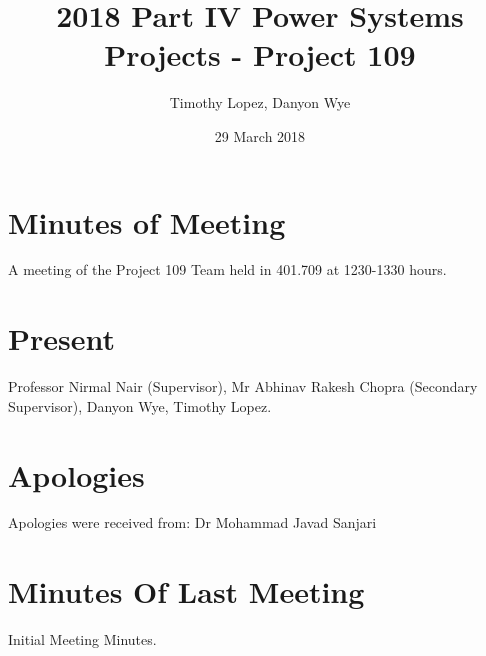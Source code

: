 \documentclass[a4paper,12pt]{article}
\title{2018 Part IV Power Systems Projects - Project 109}
\author{Timothy Lopez, Danyon Wye}
\date{29 March 2018}
\begin{document}
\maketitle


\section{Minutes of Meeting}
A meeting of the Project 109 Team held in 401.709 at 1230-1330 hours.

\section{Present}
Professor Nirmal Nair (Supervisor), Mr Abhinav Rakesh Chopra (Secondary Supervisor), Danyon Wye, Timothy Lopez.


\section{Apologies}
Apologies were received from: Dr Mohammad Javad Sanjari


\section{Minutes Of Last Meeting}
Initial Meeting Minutes.
\end{document}
